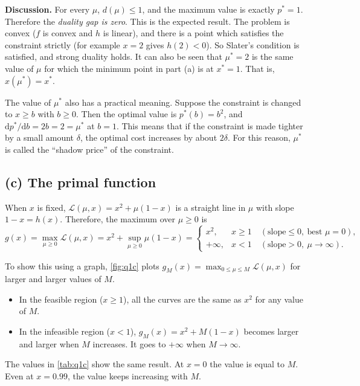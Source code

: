 \documentclass[11pt,a4paper]{article}
\newcommand{\Lag}{\mathcal{L}}
\begin{document}
\textbf{Discussion.} For every $\mu$, $d(\mu)\le 1$, and the maximum value is
exactly $p^*=1$. Therefore the \emph{duality gap is zero}. This is the
expected result. The problem is convex ($f$ is convex and $h$ is linear), and
there is a point which satisfies the constraint strictly (for example $x=2$
gives $h(2)<0$). So Slater's condition is satisfied, and strong duality
holds. It can also be seen that $\mu^*=2$ is the same value of $\mu$ for which
the minimum point in part (a) is at $x^*=1$. That is, $x(\mu^*)=x^*$.

The value of $\mu^*$ also has a practical meaning. Suppose the constraint is
changed to $x\ge b$ with $b\ge 0$. Then the optimal value is $p^*(b)=b^2$, and
$\mathrm{d}p^*/\mathrm{d}b=2b=2=\mu^*$ at $b=1$. This means that if the
constraint is made tighter by a small amount $\delta$, the optimal cost
increases by about $2\delta$. For this reason, $\mu^*$ is called the
``shadow price'' of the constraint.

\subsection{(c) The primal function}

When $x$ is fixed, $\Lag(\mu,x)=x^2+\mu(1-x)$ is a straight line in $\mu$
with slope $1-x=h(x)$. Therefore, the maximum over $\mu\ge 0$ is
\begin{equation}
  g(x)=\max_{\mu\ge 0}\Lag(\mu,x)=x^2+\sup_{\mu\ge0}\mu(1-x)
  =\begin{cases}
     x^2, & x\ge 1 \quad (\text{slope}\le 0,\ \text{best } \mu=0),\\[0.2em]
     +\infty, & x<1 \quad (\text{slope}>0,\ \mu\to\infty).
   \end{cases}
  \label{eq:primal}
\end{equation}

To show this using a graph, \cref{fig:q1c} plots
$g_M(x)=\max_{0\le\mu\le M}\Lag(\mu,x)$ for larger and larger values of $M$.
\begin{itemize}
  \item In the feasible region ($x\ge1$), all the curves are the same as
        $x^2$ for any value of $M$.
  \item In the infeasible region ($x<1$), $g_M(x)=x^2+M(1-x)$ becomes larger
        and larger when $M$ increases. It goes to $+\infty$ when
        $M\to\infty$.
\end{itemize}
The values in \cref{tab:q1c} show the same result. At $x=0$ the value is
equal to $M$. Even at $x=0.99$, the value keeps increasing with $M$.
\end{document}
